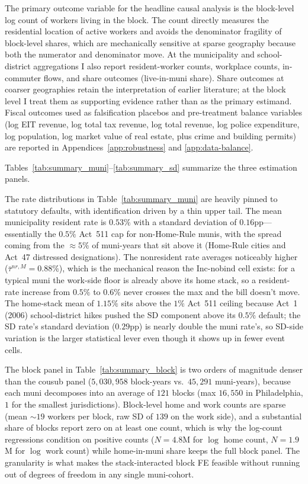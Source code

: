 \documentclass[12pt]{article}
\begin{document}
The primary outcome variable for the headline causal analysis is the
block-level log count of workers living in the block. The count
directly measures the residential location of active workers and
avoids the denominator fragility of block-level shares, which are
mechanically sensitive at sparse geography because both the
numerator and denominator move. At the municipality and
school-district aggregations I also report resident-worker counts,
workplace counts, in-commuter flows, and share outcomes
(live-in-muni share). Share outcomes at coarser geographies
retain the interpretation of earlier literature; at the block level
I treat them as supporting evidence rather than as the primary
estimand. Fiscal outcomes used as falsification placebos and
pre-treatment balance variables (log EIT revenue, log total tax
revenue, log total revenue, log police expenditure, log population,
log market value of real estate, plus crime and building permits)
are reported in Appendices~\ref{app:robustness} and
\ref{app:data-balance}.

Tables~\ref{tab:summary_muni}--\ref{tab:summary_sd} summarize the
three estimation panels.



The rate distributions in Table~\ref{tab:summary_muni} are heavily
pinned to statutory defaults, with identification driven by a thin
upper tail. The mean municipality resident rate is $0.53\%$ with a
standard deviation of $0.16$pp---essentially the $0.5\%$ Act~511 cap
for non-Home-Rule munis, with the spread coming from the
$\approx 5\%$ of muni-years that sit above it (Home-Rule cities and
Act~47 distressed designations). The nonresident rate averages
noticeably higher ($\bar{\tau}^{nr,M}=0.88\%$), which is the
mechanical reason the Inc-nobind cell exists: for a typical muni
the work-side floor is already above its home stack, so a
resident-rate increase from $0.5\%$ to $0.6\%$ never crosses the
max and the bill doesn't move. The home-stack mean of $1.15\%$ sits
above the $1\%$ Act~511 ceiling because Act~1 (2006) school-district
hikes pushed the SD component above its $0.5\%$ default; the SD
rate's standard deviation ($0.29$pp) is nearly double the muni
rate's, so SD-side variation is the larger statistical lever even
though it shows up in fewer event cells.



The block panel in Table~\ref{tab:summary_block} is two orders of
magnitude denser than the cousub panel ($5{,}030{,}958$ block-years
vs.\ $45{,}291$ muni-years), because each muni decomposes into an
average of $121$ blocks (max $16{,}550$ in Philadelphia, $1$ for the
smallest jurisdictions). Block-level home and work counts are
sparse (mean $\sim 19$ workers per block, raw SD of $139$ on the
work side), and a substantial share of blocks report zero on at
least one count, which is why the log-count regressions condition
on positive counts ($N=4.8$M for $\log$ home count, $N=1.9$M for
$\log$ work count) while home-in-muni share keeps the
full block panel. The granularity is what makes the
stack-interacted block FE feasible without running out of degrees
of freedom in any single muni-cohort.
\end{document}
